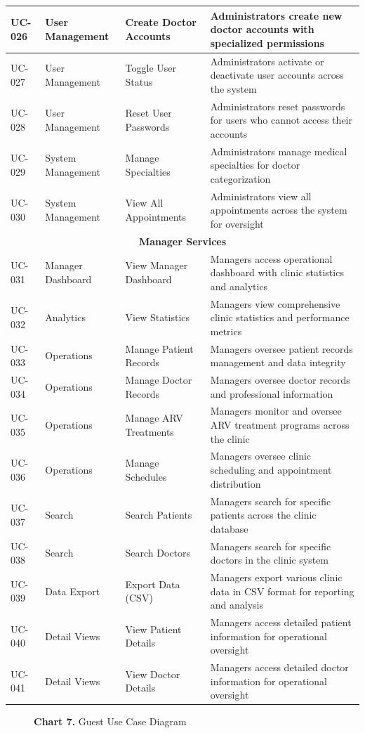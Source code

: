 \documentclass[12pt,a4paper]{article}
\begin{document}
\begin{longtable}{|p{1cm}|p{3cm}|p{3cm}|p{7cm}|}
\hline
UC-026 & User Management & Create Doctor Accounts & Administrators create new doctor accounts with specialized permissions \\
\hline
UC-027 & User Management & Toggle User Status & Administrators activate or deactivate user accounts across the system \\
\hline
UC-028 & User Management & Reset User Passwords & Administrators reset passwords for users who cannot access their accounts \\
\hline
UC-029 & System Management & Manage Specialties & Administrators manage medical specialties for doctor categorization \\
\hline
UC-030 & System Management & View All Appointments & Administrators view all appointments across the system for oversight \\
\hline
\multicolumn{4}{|c|}{\textbf{Manager Services}} \\
\hline
UC-031 & Manager Dashboard & View Manager Dashboard & Managers access operational dashboard with clinic statistics and analytics \\
\hline
UC-032 & Analytics & View Statistics & Managers view comprehensive clinic statistics and performance metrics \\
\hline
UC-033 & Operations & Manage Patient Records & Managers oversee patient records management and data integrity \\
\hline
UC-034 & Operations & Manage Doctor Records & Managers oversee doctor records and professional information \\
\hline
UC-035 & Operations & Manage ARV Treatments & Managers monitor and oversee ARV treatment programs across the clinic \\
\hline
UC-036 & Operations & Manage Schedules & Managers oversee clinic scheduling and appointment distribution \\
\hline
UC-037 & Search & Search Patients & Managers search for specific patients across the clinic database \\
\hline
UC-038 & Search & Search Doctors & Managers search for specific doctors in the clinic system \\
\hline
UC-039 & Data Export & Export Data (CSV) & Managers export various clinic data in CSV format for reporting and analysis \\
\hline
UC-040 & Detail Views & View Patient Details & Managers access detailed patient information for operational oversight \\
\hline
UC-041 & Detail Views & View Doctor Details & Managers access detailed doctor information for operational oversight \\
\hline
\end{longtable}
\begin{figure}[H]
    \centering
    
    \caption*{\textbf{Chart 7.} Guest Use Case Diagram}
\end{figure}
\end{document}
